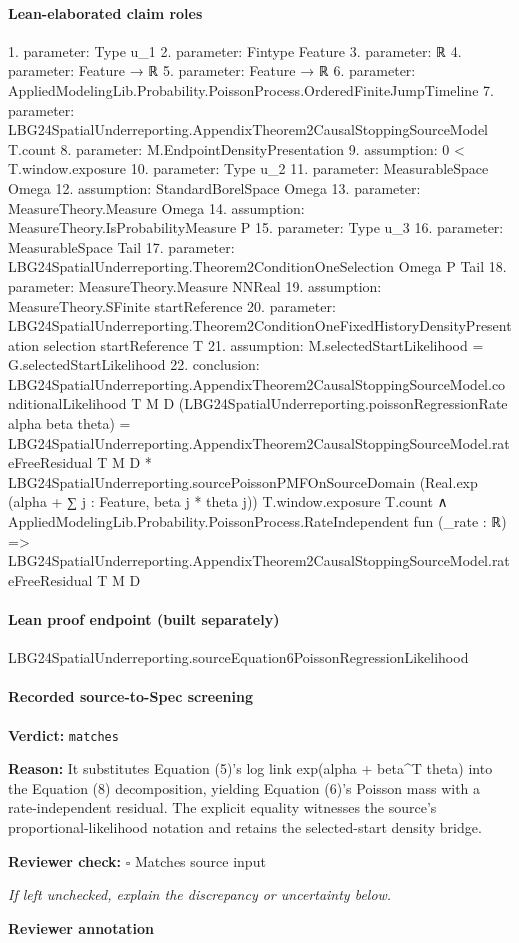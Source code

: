 \documentclass[10pt]{article}
\newcommand{\reviewerbox}{%
  \par\noindent\fbox{\parbox{0.96\linewidth}{\rule{0pt}{0.38in}}}\par
}
\newcommand{\reviewmatch}[1]{%
  \par\noindent\textbf{Reviewer check:} $\square$\; #1\par
  \noindent\emph{If left unchecked, explain the discrepancy or uncertainty below.}\par
}
\begin{document}
\paragraph{Lean-elaborated claim roles}\begin{ReviewVerbatim}
1. parameter: Type u_1
2. parameter: Fintype Feature
3. parameter: ℝ
4. parameter: Feature → ℝ
5. parameter: Feature → ℝ
6. parameter: AppliedModelingLib.Probability.PoissonProcess.OrderedFiniteJumpTimeline
7. parameter: LBG24SpatialUnderreporting.AppendixTheorem2CausalStoppingSourceModel T.count
8. parameter: M.EndpointDensityPresentation
9. assumption: 0 < T.window.exposure
10. parameter: Type u_2
11. parameter: MeasurableSpace Omega
12. assumption: StandardBorelSpace Omega
13. parameter: MeasureTheory.Measure Omega
14. assumption: MeasureTheory.IsProbabilityMeasure P
15. parameter: Type u_3
16. parameter: MeasurableSpace Tail
17. parameter: LBG24SpatialUnderreporting.Theorem2ConditionOneSelection Omega P Tail
18. parameter: MeasureTheory.Measure NNReal
19. assumption: MeasureTheory.SFinite startReference
20. parameter: LBG24SpatialUnderreporting.Theorem2ConditionOneFixedHistoryDensityPresentation selection startReference T
21. assumption: M.selectedStartLikelihood = G.selectedStartLikelihood
22. conclusion: LBG24SpatialUnderreporting.AppendixTheorem2CausalStoppingSourceModel.conditionalLikelihood T M D
      (LBG24SpatialUnderreporting.poissonRegressionRate alpha beta theta) =
    LBG24SpatialUnderreporting.AppendixTheorem2CausalStoppingSourceModel.rateFreeResidual T M D *
      LBG24SpatialUnderreporting.sourcePoissonPMFOnSourceDomain (Real.exp (alpha + ∑ j : Feature, beta j * theta j))
        T.window.exposure T.count ∧
  AppliedModelingLib.Probability.PoissonProcess.RateIndependent fun (_rate : ℝ) =>
    LBG24SpatialUnderreporting.AppendixTheorem2CausalStoppingSourceModel.rateFreeResidual T M D
\end{ReviewVerbatim}

\paragraph{Lean proof endpoint (built separately)}\begin{ReviewVerbatim}
LBG24SpatialUnderreporting.sourceEquation6PoissonRegressionLikelihood
\end{ReviewVerbatim}

\paragraph{Recorded source-to-Spec screening}
\textbf{Verdict:} \texttt{matches}
\\
{\raggedright
\textbf{Reason:} It substitutes Equation (5)'s log link exp(alpha + beta\textasciicircum{}T theta) into the Equation (8) decomposition, yielding Equation (6)'s Poisson mass with a rate-\allowbreak{}independent residual.\allowbreak{} The explicit equality witnesses the source's proportional-\allowbreak{}likelihood notation and retains the selected-\allowbreak{}start density bridge.\allowbreak{}
\par}
\reviewmatch{Matches source input}
\noindent\textbf{Reviewer annotation}\par
\reviewerbox
\clearpage
\hypertarget{source-claim-9e3150507c569b02}{}
\end{document}
